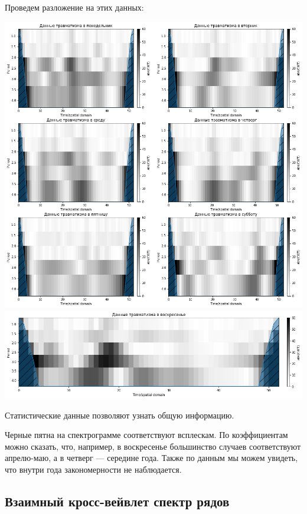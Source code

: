 \documentclass[a4paper]{article}
\begin{document}
	\newpage
	Проведем разложение на этих данных:
	\begin{center}
		\includegraphics[scale=0.46]{./output_18_0.png}
		\includegraphics[scale=0.46]{./output_18_1.png}
	\end{center}
	
	Статистические данные позволяют узнать общую информацию.
	
	Черные пятна на спектрограмме соответствуют всплескам. По коэффициентам можно сказать, что, например, в воскресенье большинство случаев соответствуют апрелю-маю, а в четверг --- середине года. Также по данным мы можем увидеть, что внутри года закономерности не наблюдается. 
	
	\newpage
	
	\subsection{Взаимный кросс-вейвлет спектр рядов}
	
\end{document}
